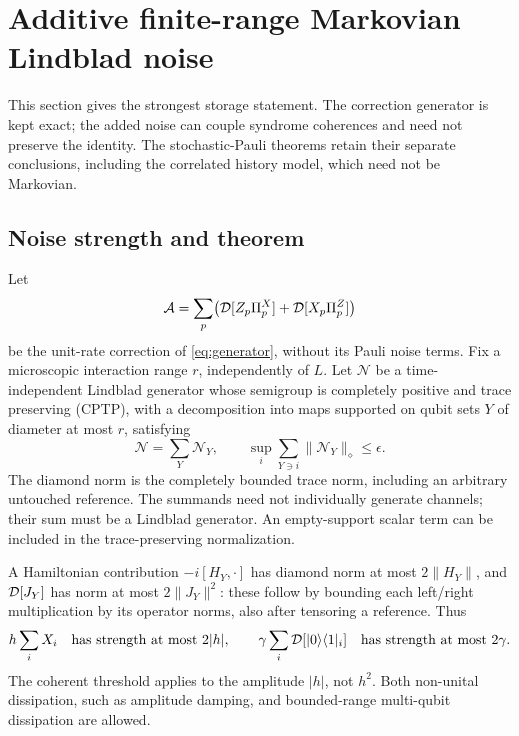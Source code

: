 \section{Additive finite-range Markovian Lindblad noise}\label{sec:general}

This section gives the strongest storage statement. The correction
generator is kept exact; the added noise can couple syndrome
coherences and need not preserve the identity. The stochastic-Pauli
theorems retain their separate conclusions, including the correlated
history model, which need not be Markovian.

\subsection{Noise strength and theorem}

Let
\[
 \mathcal A=\sum_p\bigl(\mathcal D[Z_p\Pi_p^X]+\mathcal D[X_p\Pi_p^Z]\bigr)
\]
be the unit-rate correction of \eqref{eq:generator}, without its Pauli
noise terms. Fix a microscopic interaction range \(r\), independently
of \(L\). Let \(\mathcal N\) be a time-independent Lindblad generator
whose semigroup is completely positive and trace preserving
(CPTP), with a decomposition into maps supported on qubit sets \(Y\)
of diameter at most \(r\), satisfying
\begin{equation}\label{eq:incident-strength}
 \mathcal N=\sum_Y\mathcal N_Y,\qquad
 \sup_i\sum_{Y\ni i}\|\mathcal N_Y\|_\diamond\le\epsilon .
\end{equation}
The diamond norm is the completely bounded trace norm, including an
arbitrary untouched reference. The summands need not individually
generate channels; their sum must be a Lindblad generator.
An empty-support scalar term can be included in the
trace-preserving normalization.

A Hamiltonian contribution \(-i[H_Y,\cdot]\) has diamond norm at most
\(2\|H_Y\|\), and \(\mathcal D[J_Y]\) has norm at most \(2\|J_Y\|^2\):
these follow by bounding each left/right multiplication by its
operator norms, also after tensoring a reference. Thus
\[
 h\sum_i X_i\quad\text{has strength at most }2|h|,\qquad
 \gamma\sum_i\mathcal D[|0\rangle\langle1|_i]
       \quad\text{has strength at most }2\gamma .
\]
The coherent threshold applies to the amplitude \(|h|\), not \(h^2\).
Both non-unital dissipation, such as amplitude damping, and
bounded-range multi-qubit dissipation are allowed.

